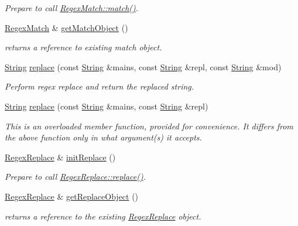 \begin{DoxyCompactItemize}
\begin{DoxyCompactList}\small\item\em Prepare to call \hyperlink{classjpcre2_1_1RegexMatch_a5868aef3a146594ea1ebef34d122bb33_a5868aef3a146594ea1ebef34d122bb33}{Regex\+Match\+::match()}. \end{DoxyCompactList}\item 
\hyperlink{classjpcre2_1_1RegexMatch}{Regex\+Match} \& \hyperlink{classjpcre2_1_1Regex_abb007e99d7e2188ec80b741e7b40668f_abb007e99d7e2188ec80b741e7b40668f}{get\+Match\+Object} ()
\begin{DoxyCompactList}\small\item\em returns a reference to existing match object. \end{DoxyCompactList}\item 
\hyperlink{namespacejpcre2_a91f03070152fb228bc116c5a737f1d16}{String} \hyperlink{classjpcre2_1_1Regex_ac592ce7a5e4210ed5f90a0105b1f2981_ac592ce7a5e4210ed5f90a0105b1f2981}{replace} (const \hyperlink{namespacejpcre2_a91f03070152fb228bc116c5a737f1d16}{String} \&mains, const \hyperlink{namespacejpcre2_a91f03070152fb228bc116c5a737f1d16}{String} \&repl, const \hyperlink{namespacejpcre2_a91f03070152fb228bc116c5a737f1d16}{String} \&mod)
\begin{DoxyCompactList}\small\item\em Perform regex replace and return the replaced string. \end{DoxyCompactList}\item 
\hyperlink{namespacejpcre2_a91f03070152fb228bc116c5a737f1d16}{String} \hyperlink{classjpcre2_1_1Regex_addd7c21abd0f4cf6c532a7602cfb5835_addd7c21abd0f4cf6c532a7602cfb5835}{replace} (const \hyperlink{namespacejpcre2_a91f03070152fb228bc116c5a737f1d16}{String} \&mains, const \hyperlink{namespacejpcre2_a91f03070152fb228bc116c5a737f1d16}{String} \&repl)
\begin{DoxyCompactList}\small\item\em This is an overloaded member function, provided for convenience. It differs from the above function only in what argument(s) it accepts. \end{DoxyCompactList}\item 
\hyperlink{classjpcre2_1_1RegexReplace}{Regex\+Replace} \& \hyperlink{classjpcre2_1_1Regex_ae7235a991492fa88f1bd3fb02d59cd0a_ae7235a991492fa88f1bd3fb02d59cd0a}{init\+Replace} ()
\begin{DoxyCompactList}\small\item\em Prepare to call \hyperlink{classjpcre2_1_1RegexReplace_afd087fa7a9bfedec802d1a3dd7edbdd0_afd087fa7a9bfedec802d1a3dd7edbdd0}{Regex\+Replace\+::replace()}. \end{DoxyCompactList}\item 
\hyperlink{classjpcre2_1_1RegexReplace}{Regex\+Replace} \& \hyperlink{classjpcre2_1_1Regex_ad0b5e492eae75ef13b3d80f4fb1e3486_ad0b5e492eae75ef13b3d80f4fb1e3486}{get\+Replace\+Object} ()
\begin{DoxyCompactList}\small\item\em returns a reference to the existing \hyperlink{classjpcre2_1_1RegexReplace}{Regex\+Replace} object. \end{DoxyCompactList}\end{DoxyCompactItemize}
